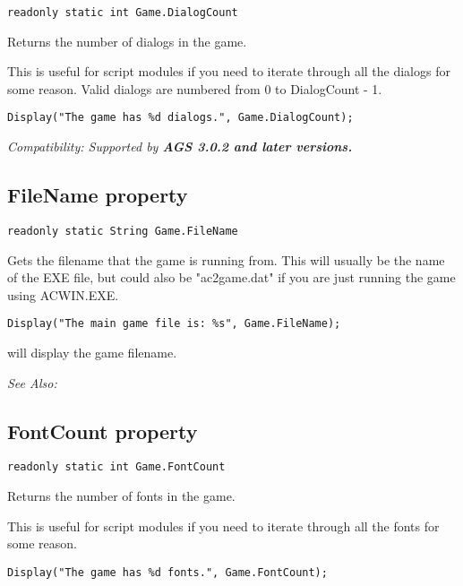 \begin{verbatim}
readonly static int Game.DialogCount
\end{verbatim}
Returns the number of dialogs in the game.

This is useful for script modules if you need to iterate through all the dialogs for some reason.
Valid dialogs are numbered from 0 to DialogCount - 1.

\begin{verbatim}
Display("The game has %d dialogs.", Game.DialogCount);
\end{verbatim}

\it{Compatibility:} Supported by \bf{AGS 3.0.2} and later versions.


\subsection{FileName property}\label{Game.FileName}%

\begin{verbatim}
readonly static String Game.FileName
\end{verbatim}
Gets the filename that the game is running from. This will usually be the name of the EXE file,
but could also be "ac2game.dat" if you are just running the game using ACWIN.EXE.

\begin{verbatim}
Display("The main game file is: %s", Game.FileName);
\end{verbatim}
will display the game filename.

\it{See Also:} 


\subsection{FontCount property}\label{Game.FontCount}%

\begin{verbatim}
readonly static int Game.FontCount
\end{verbatim}
Returns the number of fonts in the game.

This is useful for script modules if you need to iterate through all the fonts for some reason.

\begin{verbatim}
Display("The game has %d fonts.", Game.FontCount);
\end{verbatim}


